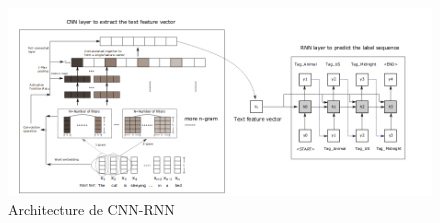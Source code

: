 \begin{figure}
\centering
\includegraphics[scale=0.4]{./tex/natural-language-processing/cnnrnn.png}
\caption{Architecture de CNN-RNN}
\label{cnnrnn}
\end{figure}


